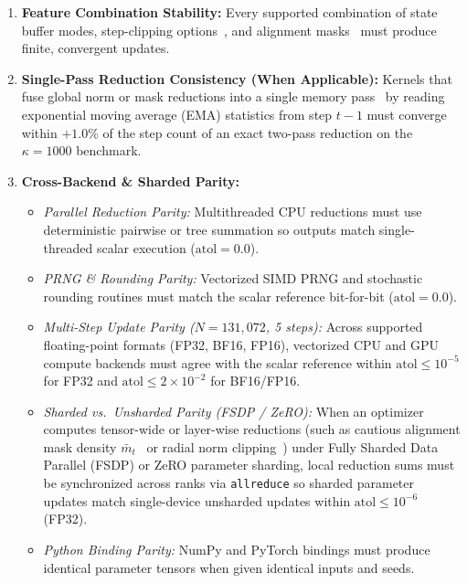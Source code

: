 \documentclass[11pt,a4paper]{article}
\renewcommand{\_}{\origunderscore\allowbreak}
\begin{document}
\begin{enumerate}[label=\textbf{A\arabic*.}, leftmargin=2.4em, itemsep=0.4em]
    \item \textbf{Feature Combination Stability:} Every supported combination of state buffer modes, step-clipping options~\cite{brock2021nfnet}, and alignment masks~\cite{liang2026cautious} must produce finite, convergent updates.

    \item \textbf{Single-Pass Reduction Consistency (When Applicable):} Kernels that fuse global norm or mask reductions into a single memory pass~\cite{dao2022flashattention,tillet2019triton} by reading exponential moving average (EMA) statistics from step $t-1$ must converge within $+1.0\%$ of the step count of an exact two-pass reduction on the $\kappa = 1000$ benchmark.

    \item \textbf{Cross-Backend \& Sharded Parity:}
    \begin{itemize}[leftmargin=1.5em, itemsep=0.25em]
        \item \textit{Parallel Reduction Parity:} Multithreaded CPU reductions must use deterministic pairwise or tree summation so outputs match single-threaded scalar execution ($\text{atol} = 0.0$).
        \item \textit{PRNG \& Rounding Parity:} Vectorized SIMD PRNG and stochastic rounding routines must match the scalar reference bit-for-bit ($\text{atol} = 0.0$).
        \item \textit{Multi-Step Update Parity ($N = 131,072$, 5 steps):} Across supported floating-point formats (FP32, BF16, FP16), vectorized CPU and GPU compute backends must agree with the scalar reference within $\text{atol} \le 10^{-5}$ for FP32 and $\text{atol} \le 2 \times 10^{-2}$ for BF16/FP16.
        \item \textit{Sharded vs.\ Unsharded Parity (FSDP / ZeRO):} When an optimizer computes tensor-wide or layer-wise reductions (such as cautious alignment mask density $\bar{m}_t$~\cite{liang2026cautious} or radial norm clipping~\cite{brock2021nfnet}) under Fully Sharded Data Parallel (FSDP) or ZeRO parameter sharding, local reduction sums must be synchronized across ranks via \texttt{all\_reduce} so sharded parameter updates match single-device unsharded updates within $\text{atol} \le 10^{-6}$ (FP32).
        \item \textit{Python Binding Parity:} NumPy and PyTorch bindings must produce identical parameter tensors when given identical inputs and seeds.
    \end{itemize}
\end{enumerate}
\end{document}
